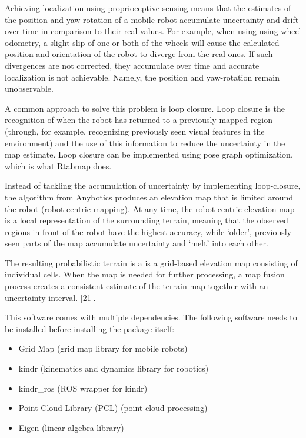 \documentclass{article}
\begin{document}
Achieving localization using proprioceptive sensing means that the estimates of the
position and yaw-rotation of a mobile robot accumulate uncertainty and drift over time in comparison to their real values. For example, when using using wheel odometry, a slight slip of one or both of the wheels will cause the calculated position and orientation of the robot to diverge from the real ones. If such divergences are not corrected, they accumulate over time and accurate localization is not achievable. Namely, the position and yaw-rotation remain unobservable.

A common approach to solve this problem is loop closure. Loop closure is the recognition of when the robot has returned to a previously mapped region (through, for example, recognizing previously seen visual features in the environment) and the use of this information to reduce the uncertainty in the
map estimate. Loop closure can be implemented using pose graph optimization, which is what Rtabmap does.

Instead of tackling the accumulation of uncertainty by implementing loop-closure, the algorithm from Anybotics produces an elevation map that is limited around the robot (robot-centric mapping). At any time, the robot-centric elevation map is a local representation of the surrounding terrain, meaning that the observed regions in front of the robot have the highest accuracy, while ‘older’, previously seen parts of the map accumulate uncertainty and ‘melt’ into each other.

The resulting probabilistic terrain is a is a grid-based elevation map consisting of individual cells. When the map is needed for further processing, a map fusion process creates a consistent estimate of the terrain map together with an uncertainty interval.
\href{https://www.research-collection.ethz.ch/bitstream/handle/20.500.11850/272110/fankhauser2018.pdf?sequence=1&isAllowed=y}{[21]}. 

This software comes with multiple dependencies. The following software needs to be installed before installing the package itself:

\begin{itemize}
    \item Grid Map (grid map library for mobile robots)
    \item kindr (kinematics and dynamics library for robotics)
    \item kindr\_ros (ROS wrapper for kindr)
    \item Point Cloud Library (PCL) (point cloud processing)
    \item Eigen (linear algebra library)
\end{itemize}
\end{document}
